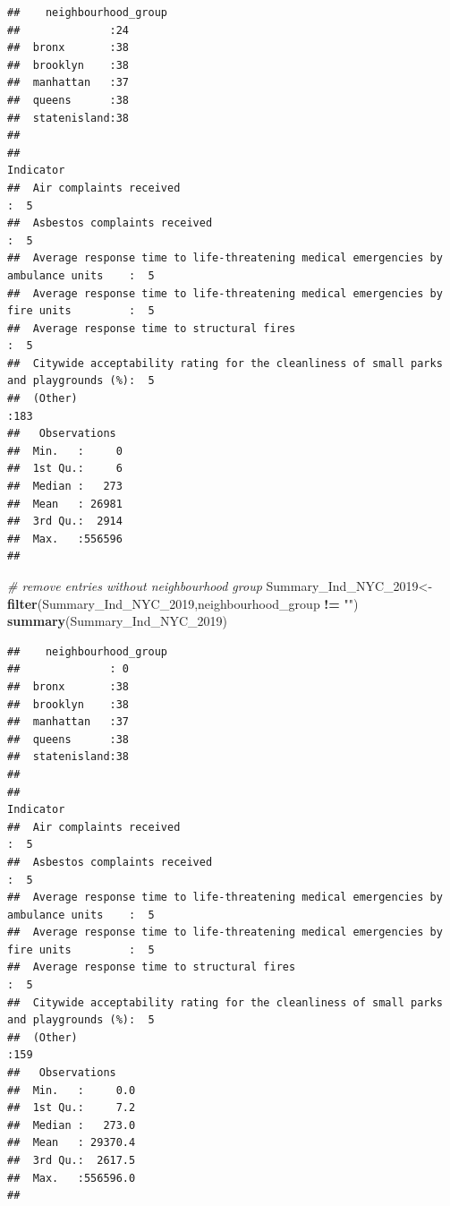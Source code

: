 \documentclass[]{article}
\newenvironment{Shaded}{\begin{snugshade}}{\end{snugshade}}
\newcommand{\CommentTok}[1]{\textcolor[rgb]{0.56,0.35,0.01}{\textit{#1}}}
\newcommand{\DecValTok}[1]{\textcolor[rgb]{0.00,0.00,0.81}{#1}}
\newcommand{\KeywordTok}[1]{\textcolor[rgb]{0.13,0.29,0.53}{\textbf{#1}}}
\newcommand{\NormalTok}[1]{#1}
\newcommand{\OperatorTok}[1]{\textcolor[rgb]{0.81,0.36,0.00}{\textbf{#1}}}
\newcommand{\StringTok}[1]{\textcolor[rgb]{0.31,0.60,0.02}{#1}}
\begin{document}
\begin{verbatim}
##    neighbourhood_group
##              :24      
##  bronx       :38      
##  brooklyn    :38      
##  manhattan   :37      
##  queens      :38      
##  statenisland:38      
##                       
##                                                                                 Indicator  
##  Air complaints received                                                             :  5  
##  Asbestos complaints received                                                        :  5  
##  Average response time to life-threatening medical emergencies by ambulance units    :  5  
##  Average response time to life-threatening medical emergencies by fire units         :  5  
##  Average response time to structural fires                                           :  5  
##  Citywide acceptability rating for the cleanliness of small parks and playgrounds (%):  5  
##  (Other)                                                                             :183  
##   Observations   
##  Min.   :     0  
##  1st Qu.:     6  
##  Median :   273  
##  Mean   : 26981  
##  3rd Qu.:  2914  
##  Max.   :556596  
## 
\end{verbatim}

\begin{Shaded}
\begin{Highlighting}[]
\CommentTok{# remove entries without neighbourhood group}
\NormalTok{Summary_Ind_NYC_}\DecValTok{2019}\NormalTok{<-}\KeywordTok{filter}\NormalTok{(Summary_Ind_NYC_}\DecValTok{2019}\NormalTok{,neighbourhood_group }\OperatorTok{!=}\StringTok{ ""}\NormalTok{)}
\KeywordTok{summary}\NormalTok{(Summary_Ind_NYC_}\DecValTok{2019}\NormalTok{)}
\end{Highlighting}
\end{Shaded}

\begin{verbatim}
##    neighbourhood_group
##              : 0      
##  bronx       :38      
##  brooklyn    :38      
##  manhattan   :37      
##  queens      :38      
##  statenisland:38      
##                       
##                                                                                 Indicator  
##  Air complaints received                                                             :  5  
##  Asbestos complaints received                                                        :  5  
##  Average response time to life-threatening medical emergencies by ambulance units    :  5  
##  Average response time to life-threatening medical emergencies by fire units         :  5  
##  Average response time to structural fires                                           :  5  
##  Citywide acceptability rating for the cleanliness of small parks and playgrounds (%):  5  
##  (Other)                                                                             :159  
##   Observations     
##  Min.   :     0.0  
##  1st Qu.:     7.2  
##  Median :   273.0  
##  Mean   : 29370.4  
##  3rd Qu.:  2617.5  
##  Max.   :556596.0  
## 
\end{verbatim}
\end{document}
